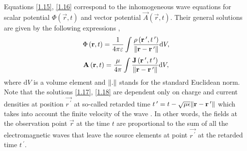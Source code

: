 Equations \ref{1.15}, \ref{1.16} correspond to the inhomogeneous wave equations for scalar potential $ \Phi\left(\vec{r}, t \right) $ and vector potential $ \vec{A}\left(\vec{r}, t \right) $. Their general solutions are given by the following expressions \cite{Thide2011},
\begin{equation}
\label{1.17}
\Phi\left(\mathbf{r}, t \right) = \frac{1}{4 \pi \varepsilon} \int \frac{\rho\left(\mathbf{r^{\: \prime}}, t^{\: \prime} \right)}{\lVert\mathbf{r} - \mathbf{r^{\: \prime}}\rVert} \mathrm{d} V,
\end{equation}
\begin{equation}
\label{1.18}
\mathbf{A}\left(\mathbf{r}, t \right) = \frac{\mu}{4 \pi} \int \frac{\mathbf{J}\left(\mathbf{r^{\: \prime}}, t^{\: \prime} \right)}{\lVert\mathbf{r} - \mathbf{r^{\: \prime}}\rVert} \mathrm{d} V,
\end{equation}
where $ \mathrm{d} V $ is a volume element and $ \lVert.\rVert $ stands for the standard Euclidean norm. Note that the solutions \ref{1.17}, \ref{1.18} are dependent only on charge and current densities at position $ \vec{r^{\: \prime}} $ at so-called retarded time $ t^{\: \prime} = t - \sqrt{\mu \epsilon} \lVert\mathbf{r} - \mathbf{r^{\: \prime}}\rVert $ which takes into account the finite velocity of the wave \cite{Feynman1963}. In other words, the fields at the observation point $ \vec{r} $ at the time $ t $ are proportional to the sum of all the electromagnetic waves that leave the source elements at point $ \vec{r^{\: \prime}} $ at the retarded time $ t^{\: \prime} $.
